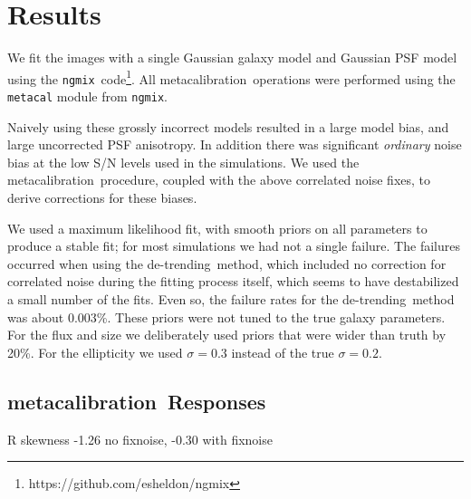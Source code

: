 \documentclass[usegraphicx,usenatbib]{mn2e}
\newcommand{\mcal}{metacalibration}
\newcommand{\detrend}{de-trending}
\newcommand{\ngmix}{\texttt{ngmix}}
\begin{document}
\section{Results} \label{sec:detrendsim}

We fit the images with a single Gaussian galaxy model and Gaussian PSF model
using the \ngmix\ code\footnote{https://github.com/esheldon/ngmix}.  All \mcal\
operations were performed using the \texttt{metacal} module from \ngmix.

Naively using these grossly incorrect models resulted in a large model bias,
and large uncorrected PSF anisotropy.  In addition there was significant {\em
ordinary} noise bias at the low S/N levels used in the simulations.  We used
the \mcal\ procedure, coupled with the above correlated noise fixes,
to derive corrections for these biases.

We used a maximum likelihood fit, with smooth priors on all parameters to
produce a stable fit; for most simulations we had not a single failure. The
failures occurred when using the \detrend\ method, which included no correction
for correlated noise during the fitting process itself, which seems to have
destabilized a small number of the fits.  Even so, the failure rates for the
\detrend\ method was about 0.003\%.  These priors were not tuned to the true
galaxy parameters.  For the flux and size we deliberately used priors that were
wider than truth by 20\%.  For the ellipticity we used $\sigma=0.3$ instead of
the true $\sigma=0.2$.

\subsection{\mcal\ Responses}

R skewness -1.26 no fixnoise,  -0.30 with fixnoise
\end{document}
